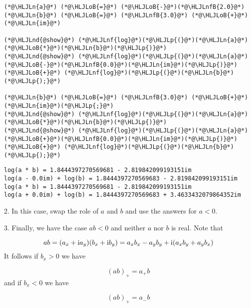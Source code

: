 \documentclass[12pt,a4paper]{article}
\newcommand{\HLJLn}[1]{#1}
\newcommand{\HLJLnd}[1]{\textcolor[RGB]{214,102,97}{#1}}
\newcommand{\HLJLnf}[1]{\textcolor[RGB]{66,102,213}{#1}}
\newcommand{\HLJLnfB}[1]{\textcolor[RGB]{59,151,46}{#1}}
\newcommand{\HLJLoB}[1]{\textcolor[RGB]{102,102,102}{\textbf{#1}}}
\newcommand{\HLJLp}[1]{#1}
\def\I{ {\rm i} }
\begin{document}
\begin{lstlisting}
(*@\HLJLn{a}@*) (*@\HLJLoB{=}@*) (*@\HLJLoB{-}@*)(*@\HLJLnfB{2.0}@*)
(*@\HLJLn{b}@*) (*@\HLJLoB{=}@*) (*@\HLJLnfB{3.0}@*) (*@\HLJLoB{+}@*) (*@\HLJLn{im}@*)

(*@\HLJLnd{@show}@*) (*@\HLJLnf{log}@*)(*@\HLJLp{(}@*)(*@\HLJLn{a}@*)(*@\HLJLoB{*}@*)(*@\HLJLn{b}@*)(*@\HLJLp{)}@*)
(*@\HLJLnd{@show}@*) (*@\HLJLnf{log}@*)(*@\HLJLp{(}@*)(*@\HLJLn{a}@*)(*@\HLJLoB{-}@*)(*@\HLJLnfB{0.0}@*)(*@\HLJLn{im}@*)(*@\HLJLp{)}@*) (*@\HLJLoB{+}@*) (*@\HLJLnf{log}@*)(*@\HLJLp{(}@*)(*@\HLJLn{b}@*)(*@\HLJLp{);}@*)

(*@\HLJLn{b}@*) (*@\HLJLoB{=}@*) (*@\HLJLnfB{3.0}@*) (*@\HLJLoB{+}@*) (*@\HLJLn{im}@*)(*@\HLJLp{;}@*)
(*@\HLJLnd{@show}@*) (*@\HLJLnf{log}@*)(*@\HLJLp{(}@*)(*@\HLJLn{a}@*)(*@\HLJLoB{*}@*)(*@\HLJLn{b}@*)(*@\HLJLp{)}@*)
(*@\HLJLnd{@show}@*) (*@\HLJLnf{log}@*)(*@\HLJLp{(}@*)(*@\HLJLn{a}@*)(*@\HLJLoB{+}@*)(*@\HLJLnfB{0.0}@*)(*@\HLJLn{im}@*)(*@\HLJLp{)}@*) (*@\HLJLoB{+}@*) (*@\HLJLnf{log}@*)(*@\HLJLp{(}@*)(*@\HLJLn{b}@*)(*@\HLJLp{);}@*)
\end{lstlisting}

\begin{lstlisting}
log(a * b) = 1.8444397270569681 - 2.819842099193151im
log(a - 0.0im) + log(b) = 1.8444397270569683 - 2.819842099193151im
log(a * b) = 1.8444397270569681 - 2.819842099193151im
log(a + 0.0im) + log(b) = 1.8444397270569683 + 3.4633432079864352im
\end{lstlisting}


2. In this case, swap the role of $a$ and $b$ and use the answers for $a < 0$.

3. Finally, we have the case $a b < 0$ and neither $a$ nor $b$ is real. Note that

\[
ab = (a_x + \I a_y) (b_x + \I b_y) = a_x b_x - a_y b_y +  \I(a_x b_y + a_yb_x)
\]
It follows if $b_x > 0$ we have

\[
(ab)_+ = a_+ b
\]
and if $b_x < 0$ we have

\[
(ab)_+ = a_- b
\]
\end{document}
